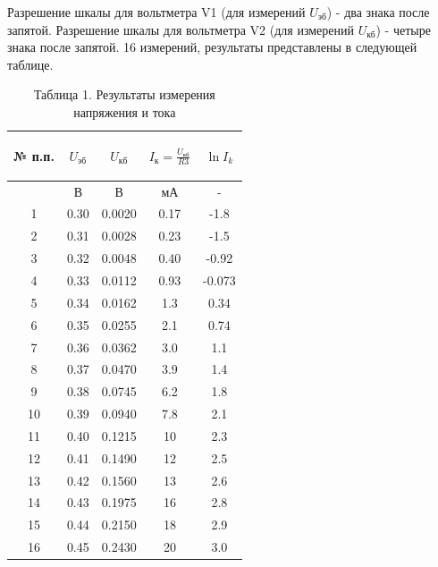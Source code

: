 Разрешение шкалы для вольтметра V1 (для измерений $U_{\text{эб}}$) - два знака после запятой. Разрешение шкалы для вольтметра V2 (для измерений $U_{\text{кб}}$) - четыре знака после запятой. 16 измерений, результаты представлены в следующей таблице.

\begin{center}
\begin{table}[h!]
\centering
\caption*{Таблица 1. Результаты измерения напряжения и тока}

\label{table:t1}
\begin{tabular}{|c|c|c|c|c|}
\hline
\begin{minipage}{7mm}
    № п.п. 
\end{minipage}&
\begin{minipage}{3cm}
    \begin{center} $U_{\text{эб}}$ \end{center}
\end{minipage} &
\begin{minipage}{3cm}
    \begin{center} $U_{\text{кб}}$ \end{center}
\end{minipage} &
\begin{minipage}{3cm}
    \begin{center} $I_{\text{к}}=\frac{U_{\text{кб}}}{R3}$ \end{center}
\end{minipage}&
\begin{minipage}{3cm}
   \begin{center} $\ln I_k$ \end{center}
\end{minipage}\\
\hline
{}&В&В&мА&-\\
\hline
1 &  0.30  &  0.0020  &  0.17 & -1.8 \\
2 &  0.31  &  0.0028  & 0.23  & -1.5 \\
3 &  0.32  &  0.0048  &  0.40 & -0.92\\
4 & 0.33  &  0.0112  &  0.93 & -0.073\\
5 & 0.34  &  0.0162  &  1.3 & 0.34\\
6 & 0.35  &  0.0255  &  2.1 & 0.74\\
7 & 0.36  &  0.0362  &  3.0 & 1.1\\
8 & 0.37  &  0.0470  &  3.9 & 1.4\\
9& 0.38  &  0.0745  &   6.2 & 1.8\\
10 &  0.39  &  0.0940  &  7.8 &  2.1\\
11 &  0.40  &  0.1215  &  10 & 2.3\\
12 &  0.41  & 0.1490 &  12 & 2.5\\
13 & 0.42 &  0.1560  &  13 & 2.6\\
14 & 0.43  &  0.1975  &  16 & 2.8\\
15 & 0.44  &  0.2150  & 18  & 2.9\\
16 & 0.45  &  0.2430  &  20 & 3.0\\
\hline
\end{tabular}
\end{table}
\end{center}


